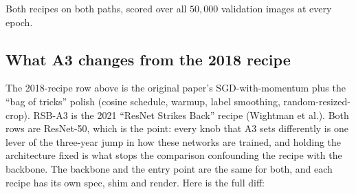 \noindent Both recipes on both paths, scored over all $50{,}000$ validation
images at every epoch.

\subsection*{What A3 changes from the 2018 recipe}
\label{sec:r50_a3_vs_2018}

The 2018-recipe row above is the original paper's SGD-with-momentum plus the
``bag of tricks'' polish (cosine schedule, warmup, label smoothing,
random-resized-crop). RSB-A3 is the 2021 ``ResNet Strikes Back'' recipe
(Wightman et al.). Both rows are ResNet-50, which is the point: every knob that
A3 sets differently is one lever of the three-year jump in how these networks
are trained, and holding the architecture fixed is what stops the comparison
confounding the recipe with the backbone. The backbone and the entry point
are the same for both, and each recipe has its own spec, shim and render.
Here is the full diff:

